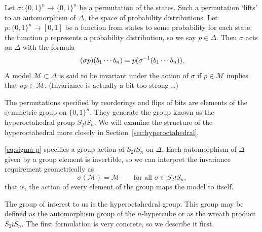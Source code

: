 \documentclass[cclicense]{hmcthesis}
\providecommand*{\ms}{\mathcal M}
\numberwithin{equation}{chapter}
\numberwithin{thmcounter}{chapter}
\begin{document}
    Let $\sigma: \{0, 1\}^n \to \{0, 1\}^n$ be a permutation of the states.
    Such a permutation `lifts' to an automorphism of $\Delta$, the space of
    probability distributions.  Let $p: \{0, 1\}^n \to [0, 1]$ be a function
    from states to some probability for each state; the function $p$ represents
    a probability distribution, so we say $p \in \Delta$.  Then $\sigma$ acts on
    $\Delta$ with the formula
    \begin{equation}
        (\sigma p)(b_1 \cdots b_n) = p(\sigma^{-1}(b_1 \cdots b_n)).
        \label{eq:sigma-p}
    \end{equation}
    A model $\ms \subset \Delta$ is said to be invariant under the action of
    $\sigma$ if $p \in \ms$ implies that $\sigma p \in \ms$.  (Invariance is
    actually a bit too strong \ldots)

    The permutations specified by reorderings and flips of bits are elements of
    the symmetric group on $\{0, 1\}^n$.  They generate the group known as the
    hyperoctahedral group $S_2 \wr S_n$.  We will examine the structure of the
    hyperoctahedral more closely in Section~\ref{sec:hyperoctahedral}.

    \eqref{eq:sigma-p} specifies a group action of $S_2 \wr S_n$ on $\Delta$.
    Each automorphism of $\Delta$ given by a group element is invertible, so we
    can interpret the invariance requirement geometrically as
    \[
        \sigma(\ms) = \ms
        \qquad
        \text{for all $\sigma \in S_2 \wr S_n$},
    \]
    that is, the action of every element of the group maps the model to itself.


    The group of interest to us is the hyperoctahedral group.  This group may be
    defined as the automorphism group of the $n$-hypercube or as the wreath
    product $S_2 \wr S_n$.
    The first formulation is very concrete, so we describe it first. 
\end{document}
